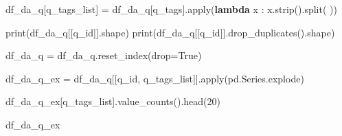 \documentclass[
  letterpaper,
  DIV=11,
  numbers=noendperiod]{scrartcl}
\newenvironment{Shaded}{\begin{snugshade}}{\end{snugshade}}
\newcommand{\BuiltInTok}[1]{\textcolor[rgb]{0.00,0.23,0.31}{#1}}
\newcommand{\DecValTok}[1]{\textcolor[rgb]{0.68,0.00,0.00}{#1}}
\newcommand{\KeywordTok}[1]{\textcolor[rgb]{0.00,0.23,0.31}{\textbf{#1}}}
\newcommand{\NormalTok}[1]{\textcolor[rgb]{0.00,0.23,0.31}{#1}}
\newcommand{\OperatorTok}[1]{\textcolor[rgb]{0.37,0.37,0.37}{#1}}
\newcommand{\StringTok}[1]{\textcolor[rgb]{0.13,0.47,0.30}{#1}}
\newcommand{\VariableTok}[1]{\textcolor[rgb]{0.07,0.07,0.07}{#1}}
\begin{document}
\begin{Shaded}
\begin{Highlighting}[]
\NormalTok{df\_da\_q[}\StringTok{\textquotesingle{}q\_tags\_list\textquotesingle{}}\NormalTok{] }\OperatorTok{=}\NormalTok{ df\_da\_q[}\StringTok{\textquotesingle{}q\_tags\textquotesingle{}}\NormalTok{].}\BuiltInTok{apply}\NormalTok{(}\KeywordTok{lambda}\NormalTok{ x : x.strip().split(}\StringTok{\textquotesingle{} \textquotesingle{}}\NormalTok{))}
\end{Highlighting}
\end{Shaded}

\begin{Shaded}
\begin{Highlighting}[]
\BuiltInTok{print}\NormalTok{(df\_da\_q[[}\StringTok{\textquotesingle{}q\_id\textquotesingle{}}\NormalTok{]].shape)}
\BuiltInTok{print}\NormalTok{(df\_da\_q[[}\StringTok{\textquotesingle{}q\_id\textquotesingle{}}\NormalTok{]].drop\_duplicates().shape)}
\end{Highlighting}
\end{Shaded}

\begin{Shaded}
\begin{Highlighting}[]
\NormalTok{df\_da\_q }\OperatorTok{=}\NormalTok{ df\_da\_q.reset\_index(drop}\OperatorTok{=}\VariableTok{True}\NormalTok{)}
\end{Highlighting}
\end{Shaded}

\begin{Shaded}
\begin{Highlighting}[]
\NormalTok{df\_da\_q\_ex }\OperatorTok{=}\NormalTok{ df\_da\_q[[}\StringTok{\textquotesingle{}q\_id\textquotesingle{}}\NormalTok{, }\StringTok{\textquotesingle{}q\_tags\_list\textquotesingle{}}\NormalTok{]].}\BuiltInTok{apply}\NormalTok{(pd.Series.explode)}
\end{Highlighting}
\end{Shaded}

\begin{Shaded}
\begin{Highlighting}[]
\NormalTok{df\_da\_q\_ex[}\StringTok{\textquotesingle{}q\_tags\_list\textquotesingle{}}\NormalTok{].value\_counts().head(}\DecValTok{20}\NormalTok{)}
\end{Highlighting}
\end{Shaded}

\begin{Shaded}
\begin{Highlighting}[]
\NormalTok{df\_da\_q\_ex}
\end{Highlighting}
\end{Shaded}
\end{document}
